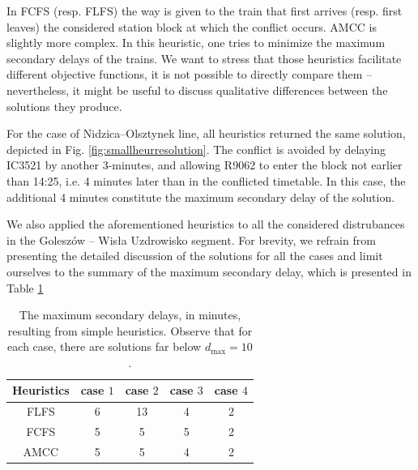 In FCFS (resp. FLFS) the way is given to the train that first arrives (resp.
first leaves) the considered station block at which the conflict occurs. AMCC
is slightly more complex. In this heuristic, one tries to minimize the maximum
secondary delays of the trains. We want to stress that those heuristics
facilitate different objective functions, it is not possible to directly
compare them -- nevertheless, it might be useful to discuss qualitative
differences between the solutions they produce.

For the case of Nidzica--Olsztynek line, all heuristics returned the same
solution, depicted in Fig. \ref{fig:smallheurresolution}. The conflict is
avoided by delaying IC3521 by another 3-minutes, and allowing R9062 to enter
the block not earlier than 14:25, i.e. 4 minutes later than in the conflicted
timetable. In this case, the additional 4 minutes constitute the maximum
secondary delay of the solution.

We also applied the aforementioned heuristics to all the considered
distrubances in the Goleszów -- Wisła Uzdrowisko segment. For brevity, we
refrain from presenting the detailed discussion of the solutions for all the
cases and limit ourselves to the summary of the maximum secondary delay, which
is presented in Table \ref{tab:simple}

\begin{table}
  \centering
  \begin{tabular}{ccccc}
    Heuristics & case $1$ & case $2$ & case $3$ & case $4$ \\
    \hline
    FLFS       & 6        & 13       & 4        & 2        \\
    \hline
    FCFS       & 5        & 5        & 5        & 2        \\
    \hline
    AMCC       & 5        & 5        & 4        & 2        \\
    \hline
  \end{tabular}
  \caption{The maximum secondary delays, in minutes, resulting from simple heuristics.
    Observe that for each case, there are solutions far below $d_{\text{max}} =
      10$.} \label{tab:simple}
\end{table}

